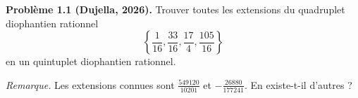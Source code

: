 \textbf{Problème 1.1 (Dujella, 2026).} Trouver toutes les extensions du quadruplet diophantien rationnel
\[
\left\{ \frac{1}{16}, \frac{33}{16}, \frac{17}{4}, \frac{105}{16} \right\}
\]
en un quintuplet diophantien rationnel.

\medskip

\textit{Remarque.} Les extensions connues sont $\frac{549120}{10201}$ et $-\frac{26880}{177241}$. En existe-t-il d'autres ?
